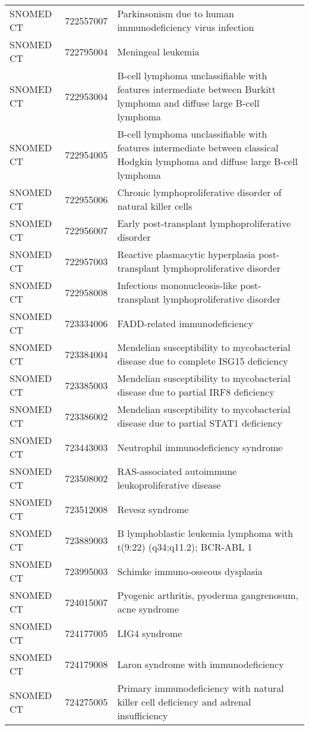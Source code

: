 \begin{longtable}{p{}p{}p{}}
  SNOMED CT & 722557007 & Parkinsonism due to human immunodeficiency virus infection \\ 
  SNOMED CT & 722795004 & Meningeal leukemia \\ 
  SNOMED CT & 722953004 & B-cell lymphoma unclassifiable with features intermediate between Burkitt lymphoma and diffuse large B-cell lymphoma \\ 
  SNOMED CT & 722954005 & B-cell lymphoma unclassifiable with features intermediate between classical Hodgkin lymphoma and diffuse large B-cell lymphoma \\ 
  SNOMED CT & 722955006 & Chronic lymphoproliferative disorder of natural killer cells \\ 
  SNOMED CT & 722956007 & Early post-transplant lymphoproliferative disorder \\ 
  SNOMED CT & 722957003 & Reactive plasmacytic hyperplasia post-transplant lymphoproliferative disorder \\ 
  SNOMED CT & 722958008 & Infectious mononucleosis-like post-transplant lymphoproliferative disorder \\ 
  SNOMED CT & 723334006 & FADD-related immunodeficiency \\ 
  SNOMED CT & 723384004 & Mendelian susceptibility to mycobacterial disease due to complete ISG15 deficiency \\ 
  SNOMED CT & 723385003 & Mendelian susceptibility to mycobacterial disease due to partial IRF8 deficiency \\ 
  SNOMED CT & 723386002 & Mendelian susceptibility to mycobacterial disease due to partial STAT1 deficiency \\ 
  SNOMED CT & 723443003 & Neutrophil immunodeficiency syndrome \\ 
  SNOMED CT & 723508002 & RAS-associated autoimmune leukoproliferative disease \\ 
  SNOMED CT & 723512008 & Revesz syndrome \\ 
  SNOMED CT & 723889003 & B lymphoblastic leukemia lymphoma with t(9:22) (q34;q11.2); BCR-ABL 1 \\ 
  SNOMED CT & 723995003 & Schimke immuno-osseous dysplasia \\ 
  SNOMED CT & 724015007 & Pyogenic arthritis, pyoderma gangrenosum, acne syndrome \\ 
  SNOMED CT & 724177005 & LIG4 syndrome \\ 
  SNOMED CT & 724179008 & Laron syndrome with immunodeficiency \\ 
  SNOMED CT & 724275005 & Primary immunodeficiency with natural killer cell deficiency and adrenal insufficiency \\ 

\end{longtable}
